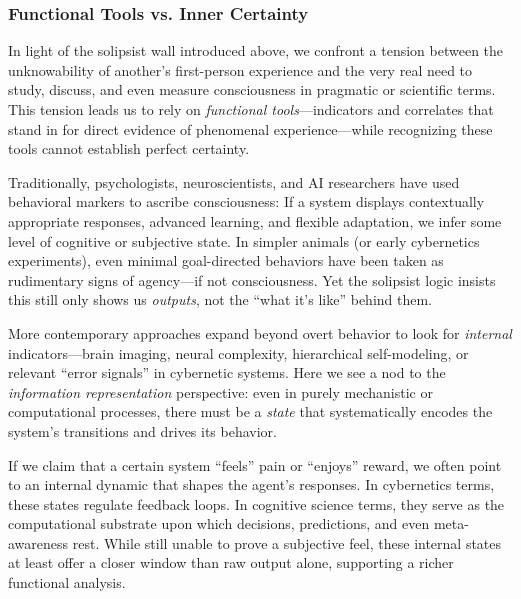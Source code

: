 \documentclass[12pt]{article}
\begin{document}
\subsubsection{Functional Tools vs. Inner Certainty}

In light of the solipsist wall introduced above, we confront a tension between the unknowability of another's first-person experience and the very real need to study, discuss, and even measure consciousness in pragmatic or scientific terms. This tension leads us to rely on \textit{functional tools}---indicators and correlates that stand in for direct evidence of phenomenal experience---while recognizing these tools cannot establish perfect certainty.


Traditionally, psychologists, neuroscientists, and AI researchers have used behavioral markers to ascribe consciousness: If a system displays contextually appropriate responses, advanced learning, and flexible adaptation, we infer some level of cognitive or subjective state. In simpler animals (or early cybernetics experiments), even minimal goal-directed behaviors have been taken as rudimentary signs of agency---if not consciousness. Yet the solipsist logic insists this still only shows us \textit{outputs}, not the ``what it's like'' behind them.


More contemporary approaches expand beyond overt behavior to look for \textit{internal} indicators---brain imaging, neural complexity, hierarchical self-modeling, or relevant ``error signals'' in cybernetic systems. Here we see a nod to the \textit{information representation} perspective: even in purely mechanistic or computational processes, there must be a \textit{state} that systematically encodes the system's transitions and drives its behavior.

If we claim that a certain system ``feels'' pain or ``enjoys'' reward, we often point to an internal dynamic that shapes the agent's responses. In cybernetics terms, these states regulate feedback loops. In cognitive science terms, they serve as the computational substrate upon which decisions, predictions, and even meta-awareness rest. While still unable to prove a subjective feel, these internal states at least offer a closer window than raw output alone, supporting a richer functional analysis.

\end{document}
